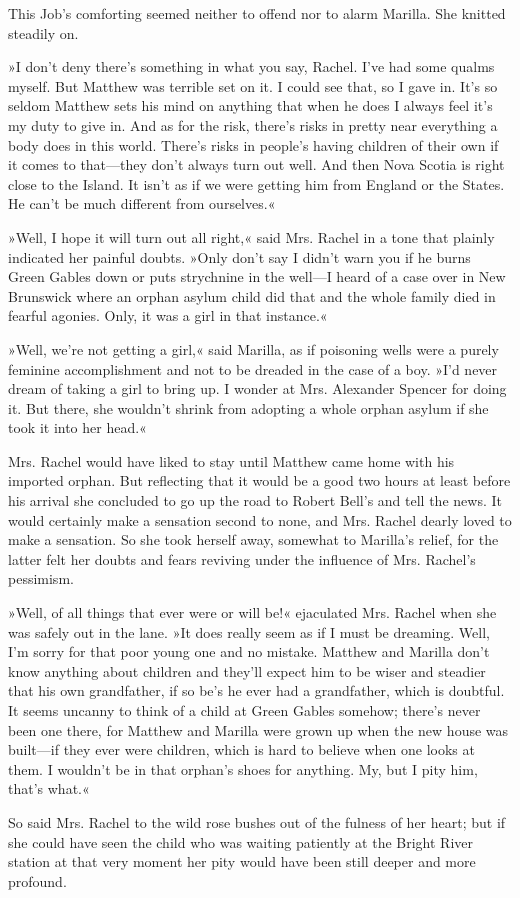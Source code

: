 This Job’s comforting seemed neither to offend nor to alarm Marilla. She knitted steadily on.

»I don’t deny there’s something in what you say, Rachel. I’ve had some qualms myself. But Matthew was terrible set on it. I could see that, so I gave in. It’s so seldom Matthew sets his mind on anything that when he does I always feel it’s my duty to give in. And as for the risk, there’s risks in pretty near everything a body does in this world. There’s risks in people’s having children of their own if it comes to that—they don’t always turn out well. And then Nova Scotia is right close to the Island. It isn’t as if we were getting him from England or the States. He can’t be much different from ourselves.«

»Well, I hope it will turn out all right,« said Mrs. Rachel in a tone that plainly indicated her painful doubts. »Only don’t say I didn’t warn you if he burns Green Gables down or puts strychnine in the well—I heard of a case over in New Brunswick where an orphan asylum child did that and the whole family died in fearful agonies. Only, it was a girl in that instance.«

»Well, we’re not getting a girl,« said Marilla, as if poisoning wells were a purely feminine accomplishment and not to be dreaded in the case of a boy. »I’d never dream of taking a girl to bring up. I wonder at Mrs. Alexander Spencer for doing it. But there, she wouldn’t shrink from adopting a whole orphan asylum if she took it into her head.«

Mrs. Rachel would have liked to stay until Matthew came home with his imported orphan. But reflecting that it would be a good two hours at least before his arrival she concluded to go up the road to Robert Bell’s and tell the news. It would certainly make a sensation second to none, and Mrs. Rachel dearly loved to make a sensation. So she took herself away, somewhat to Marilla’s relief, for the latter felt her doubts and fears reviving under the influence of Mrs. Rachel’s pessimism.

»Well, of all things that ever were or will be!« ejaculated Mrs. Rachel when she was safely out in the lane. »It does really seem as if I must be dreaming. Well, I’m sorry for that poor young one and no mistake. Matthew and Marilla don’t know anything about children and they’ll expect him to be wiser and steadier that his own grandfather, if so be’s he ever had a grandfather, which is doubtful. It seems uncanny to think of a child at Green Gables somehow; there’s never been one there, for Matthew and Marilla were grown up when the new house was built—if they ever were children, which is hard to believe when one looks at them. I wouldn’t be in that orphan’s shoes for anything. My, but I pity him, that’s what.«

So said Mrs. Rachel to the wild rose bushes out of the fulness of her heart; but if she could have seen the child who was waiting patiently at the Bright River station at that very moment her pity would have been still deeper and more profound.